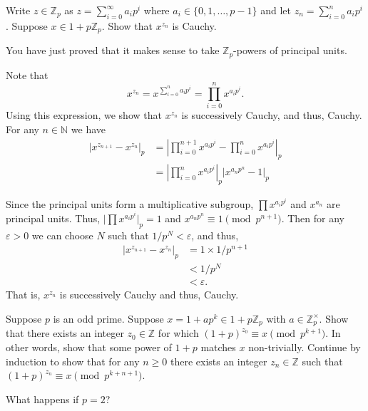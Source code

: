 \documentclass[12 pt, letterpaper]{hmcpset}
\begin{document}
\pagebreak

\begin{problem}[(7)]
	Write $z \in \mathbb{Z}_{p}$ as $z = \sum_{i = 0}^{\infty} a_{i} p^{i}$ where $a_{i} \in \{ 0, 1, \dots, p - 1 \}$ and let $z_{n} = \sum_{i = 0}^{n} a_{i} p^{i}$. Suppose $x \in 1 + p \mathbb{Z}_{p}$. Show that $x^{z_{n}}$ is Cauchy. 

	You have just proved that it makes sense to take $\mathbb{Z}_{p}$-powers of principal units.
\end{problem}

\begin{solution}
	Note that
	\[
		x^{z_{n}} = x^{\sum_{i = 0}^{n} a_{i} p^{i}} = \prod_{i = 0}^{n} x^{a_{i} p^{i}}.
	\]
	Using this expression, we show that $x^{z_{n}}$ is successively Cauchy, and thus, Cauchy. For any $n \in \mathbb{N}$ we have
	\begin{align*}
		\lvert x^{z_{n + 1}} - x^{z_{n}} \rvert_{p} & = \left \lvert \prod_{i = 0}^{n + 1} x^{a_{i} p^{i}} - \prod_{i = 0}^{n} x^{a_{i} p^{i}} \right \rvert_{p} \\
							    & = \left \lvert \prod_{i = 0}^{n} x^{a_{i} p^{i}} \right \rvert_{p} \lvert x^{a_{n} p^{n}} - 1 \rvert_{p}
	\end{align*}

	Since the principal units form a multiplicative subgroup, $\prod x^{a_{i} p^{i}}$ and $x^{a_{n}}$ are principal units. Thus, $\lvert \prod x^{a_{i} p^{i}} \rvert_{p} = 1$ and $x^{a_{n} p^{n}} \equiv 1 \pmod{p^{n + 1}}$. Then for any $\varepsilon > 0$ we can choose $N$ such that $1 / p^{N} < \varepsilon$, and thus,
	\begin{align*}
		\lvert x^{z_{n + 1}} - x^{z_{n}} \rvert_{p} & = 1 \times 1 / p^{n + 1} \\
							    & < 1 / p^{N} \\
							    & < \varepsilon.
	\end{align*}
	That is, $x^{z_{n}}$ is successively Cauchy and thus, Cauchy.
\end{solution}

\pagebreak

\begin{problem}[(8)]
	Suppose $p$ is an odd prime. Suppose $x = 1 + a p^{k} \in 1 + p \mathbb{Z}_{p}$ with $a \in \mathbb{Z}_{p}^{\times}$. Show that there exists an integer $z_{0} \in \mathbb{Z}$ for which $(1 + p)^{z_{0}} \equiv x \pmod{p^{k + 1}}$. In other words, show that some power of $1 + p$ matches $x$ non-trivially. Continue by induction to show that for any $n \ge 0$ there exists an integer $z_{n} \in \mathbb{Z}$ such that $(1 + p)^{z_{n}} \equiv x \pmod{p^{k + n + 1}}$. 

	What happens if $p = 2$?
\end{problem}
\end{document}
